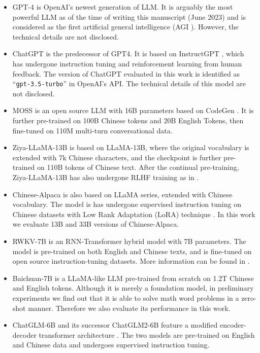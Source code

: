 \begin{itemize}[leftmargin=*]  
\item GPT-4 \citep{gpt4_report} is OpenAI's newest generation of LLM. It is arguably the most powerful LLM as of the time of writing this manuscript (June 2023) and is considered as the first artificial general intelligence (AGI \citet{gpt4_sparks}). However, the technical details are not disclosed.

\item ChatGPT is the predecessor of GPT4. It is based on InstructGPT \citep{instruct_gpt}, which has undergone instruction tuning and reinforcement learning from human feedback. The version of ChatGPT evaluated in this work is identified as ``{\tt gpt-3.5-turbo}'' in OpenAI's API.   The technical details of this model are not disclosed.

\item MOSS \citep{moss} is an open source LLM with 16B parameters based on CodeGen \citep{codegen}. It is further pre-trained on 100B Chinese tokens and 20B English Tokens, then fine-tuned on 110M multi-turn conversational data. 

\item Ziya-LLaMA-13B \citep{ziya} is based on LLaMA-13B, where the original vocabulary is extended with 7k Chinese characters, and the checkpoint is further pre-trained on 110B tokens of Chinese text. After the continual pre-training, Ziya-LLaMA-13B has also undergone RLHF training as in \citep{instruct_gpt}.

\item Chinese-Alpaca \citep{chinese-alpaca} is also based on LLaMA series, extended with Chinese vocabulary. The model is has undergone supervised instruction tuning on Chinese datasets with Low Rank Adaptation (LoRA) technique \citep{lora}. In this work we evaluate 13B and 33B versions of Chinese-Alpaca.

\item RWKV-7B \citep{RWKV} is an RNN-Transformer hybrid model with 7B parameters. The model is pre-trained on both English and Chinese texts, and is fine-tuned on open source instruction-tuning datasets.  More information can be found in \citep{rwkv-huggingface}. 

\item Baichuan-7B \citep{baichuan} is a LLaMA-like LLM pre-trained from scratch on 1.2T Chinese and English tokens. Although it is merely a foundation model, in preliminary experiments we find out that it is able to solve math word problems in a zero-shot manner.  Therefore we also evaluate its performance in this work.

\item ChatGLM-6B  \citep{chatglm6b} and its successor ChatGLM2-6B \citep{chatglm6b-v2} feature a modified encoder-decoder transformer architecture \citep{glm, glm130}. The two models are pre-trained on English and Chinese data and undergoes supervised instruction tuning. 

\end{itemize}

